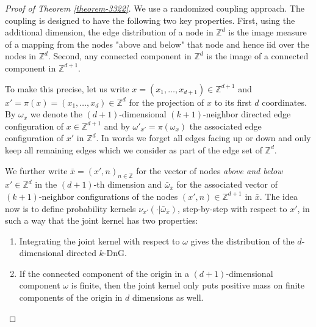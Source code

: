 \documentclass[a4paper, oneside, 11pt]{amsart}
\theoremstyle{definition}
\newcommand{\1}{\mathbbm{1}}
\newcommand{\0}{\mathbf{o}}
\newcommand{\Z}{\mathbb{Z}}
\numberwithin{equation}{section}
\begin{document}
\begin{proof}[Proof of Theorem \ref{theorem-3322}]
    We use a randomized coupling approach. The coupling is designed to have the following two key properties. First, using the additional dimension, the edge distribution of a node in $\Z^d$ is the image measure of a mapping from the nodes "above and below" that node and hence iid over the nodes in $\Z^d$. Second, any connected component in $\Z^d$ is the image of a connected component in $\Z^{d+1}$.

To make this precise, let us write $x=(x_1,\dots,x_{d+1})\in \Z^{d+1}$ and $x'=\pi(x)=(x_1,\dots, x_d)\in \Z^d$ for the projection of $x$ to its first $d$ coordinates. By $\omega_{x}$ we denote the $(d+1)$-dimensional $(k+1)$-neighbor directed edge configuration of $x\in \Z^{d+1}$ and by $\omega'_{x'}=\pi(\omega_{x})$ the associated edge configuration of $x'$ in $\Z^d$. In words we forget all edges facing up or down and only keep all remaining edges which we consider as part of the edge set of $\Z^d$. 

We further write $\bar x=(x',n)_{n\in\Z}$ for the vector of nodes {\em above and below} $x'\in \Z^d$ in the $(d+1)$-th dimension and $\bar\omega_{\bar x}$ for the associated vector of $(k+1)$-neighbor configurations of the nodes $(x',n)\in \Z^{d+1}$ in $\bar x$. The idea now is to define probability kernels $\nu_{x'}(\cdot|\bar\omega_{\bar x})$, step-by-step with respect to $x'$, in such a way that the joint kernel has two properties:
\begin{enumerate}
\item Integrating the joint kernel with respect to $\omega$ gives the distribution of the $d$-dimensional directed $k$-DnG. 
\item If the connected component of the origin in a $(d+1)$-dimensional component $\omega$ is finite, then the joint kernel only puts positive mass on finite components of the origin in $d$ dimensions as well. 
\end{enumerate}


\end{proof}
\end{document}
